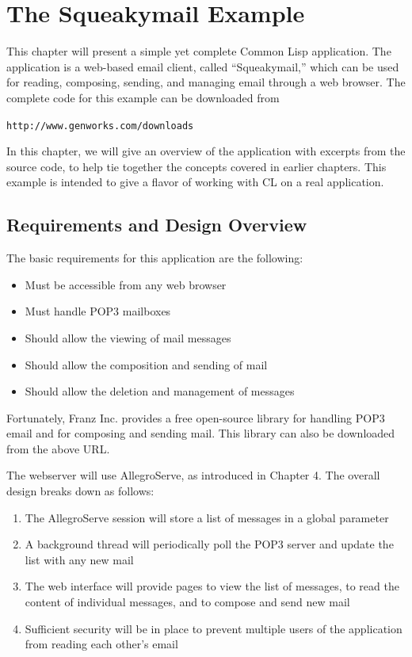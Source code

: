 \chapter{The Squeakymail Example}

This chapter will present a simple yet complete Common Lisp application. The application
is a web-based email client, called ``Squeakymail,'' which can be used for reading, composing,
sending, and managing email through a web browser. The complete code for this example
can be downloaded from

\begin{center}
\texttt{http://www.genworks.com/downloads}
\end{center}

In this chapter, we will give an overview of the application with excerpts from the source
code, to help tie together the concepts covered in earlier chapters. This example is intended
to give a flavor of working with CL on a real application.

\section{Requirements and Design Overview}

The basic requirements for this application are the following:

\begin{itemize}
\item Must be accessible from any web browser
\item Must handle POP3 mailboxes
\item Should allow the viewing of mail messages
\item Should allow the composition and sending of mail
\item Should allow the deletion and management of messages
\end{itemize}

Fortunately, Franz Inc. provides a free open-source library for handling POP3 email and
for composing and sending mail. This library can also be downloaded from the above URL.

The webserver will use AllegroServe, as introduced in Chapter 4. The overall design
breaks down as follows:

\begin{enumerate}
\item The AllegroServe session will store a list of messages in a global parameter
\item A background thread will periodically poll the POP3 server and update the list with
any new mail
\item The web interface will provide pages to view the list of messages, to read the content
of individual messages, and to compose and send new mail
\item Sufficient security will be in place to prevent multiple users of the application from
reading each other's email
\end{enumerate}

